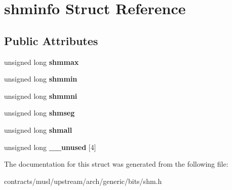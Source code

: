 \hypertarget{structshminfo}{}\section{shminfo Struct Reference}
\label{structshminfo}
\subsection*{Public Attributes}
\begin{DoxyCompactItemize}
\item 
\mbox{\label{structshminfo_a2d7778854ce2e55499a2036da769905a}} 
unsigned long {\bfseries shmmax}
\item 
\mbox{\label{structshminfo_a9940d32ac5484be0f5df79296d9bc97a}} 
unsigned long {\bfseries shmmin}
\item 
\mbox{\label{structshminfo_a084bc8449e6683ede60a6445255d14bd}} 
unsigned long {\bfseries shmmni}
\item 
\mbox{\label{structshminfo_a11ee1150ca8aaad294c17fe939f35688}} 
unsigned long {\bfseries shmseg}
\item 
\mbox{\label{structshminfo_a4b74fbc85e2805f7b99f6aecde00c570}} 
unsigned long {\bfseries shmall}
\item 
\mbox{\label{structshminfo_a68b65a802c7b3bc6d911ed41808203ef}} 
unsigned long {\bfseries \+\_\+\+\_\+unused} \mbox{[}4\mbox{]}
\end{DoxyCompactItemize}


The documentation for this struct was generated from the following file\+:\begin{DoxyCompactItemize}
\item 
contracts/musl/upstream/arch/generic/bits/shm.\+h\end{DoxyCompactItemize}
